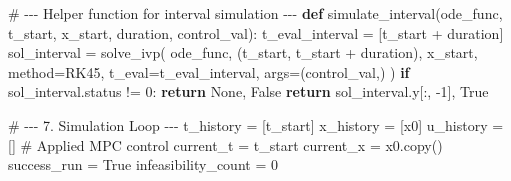 \documentclass[
  letterpaper,
  DIV=11,
  numbers=noendperiod,
  oneside]{scrartcl}
\newenvironment{Shaded}{\begin{snugshade}}{\end{snugshade}}
\newcommand{\CommentTok}[1]{\textcolor[rgb]{0.37,0.37,0.37}{#1}}
\newcommand{\ControlFlowTok}[1]{\textcolor[rgb]{0.00,0.23,0.31}{\textbf{#1}}}
\newcommand{\DecValTok}[1]{\textcolor[rgb]{0.68,0.00,0.00}{#1}}
\newcommand{\KeywordTok}[1]{\textcolor[rgb]{0.00,0.23,0.31}{\textbf{#1}}}
\newcommand{\NormalTok}[1]{\textcolor[rgb]{0.00,0.23,0.31}{#1}}
\newcommand{\OperatorTok}[1]{\textcolor[rgb]{0.37,0.37,0.37}{#1}}
\newcommand{\StringTok}[1]{\textcolor[rgb]{0.13,0.47,0.30}{#1}}
\newcommand{\VariableTok}[1]{\textcolor[rgb]{0.07,0.07,0.07}{#1}}
\begin{document}
\begin{Shaded}
\begin{Highlighting}[numbers=left,,]
\CommentTok{\# {-}{-}{-} Helper function for interval simulation {-}{-}{-}}
\KeywordTok{def}\NormalTok{ simulate\_interval(ode\_func, t\_start, x\_start, duration, control\_val):}
\NormalTok{    t\_eval\_interval }\OperatorTok{=}\NormalTok{ [t\_start }\OperatorTok{+}\NormalTok{ duration]}
\NormalTok{    sol\_interval }\OperatorTok{=}\NormalTok{ solve\_ivp(}
\NormalTok{        ode\_func, (t\_start, t\_start }\OperatorTok{+}\NormalTok{ duration), x\_start, method}\OperatorTok{=}\StringTok{\textquotesingle{}RK45\textquotesingle{}}\NormalTok{,}
\NormalTok{        t\_eval}\OperatorTok{=}\NormalTok{t\_eval\_interval, args}\OperatorTok{=}\NormalTok{(control\_val,)}
\NormalTok{    )}
    \ControlFlowTok{if}\NormalTok{ sol\_interval.status }\OperatorTok{!=} \DecValTok{0}\NormalTok{: }\ControlFlowTok{return} \VariableTok{None}\NormalTok{, }\VariableTok{False}
    \ControlFlowTok{return}\NormalTok{ sol\_interval.y[:, }\OperatorTok{{-}}\DecValTok{1}\NormalTok{], }\VariableTok{True}

\CommentTok{\# {-}{-}{-} 7. Simulation Loop {-}{-}{-}}
\NormalTok{t\_history }\OperatorTok{=}\NormalTok{ [t\_start]}
\NormalTok{x\_history }\OperatorTok{=}\NormalTok{ [x0]}
\NormalTok{u\_history }\OperatorTok{=}\NormalTok{ [] }\CommentTok{\# Applied MPC control}
\NormalTok{current\_t }\OperatorTok{=}\NormalTok{ t\_start}
\NormalTok{current\_x }\OperatorTok{=}\NormalTok{ x0.copy()}
\NormalTok{success\_run }\OperatorTok{=} \VariableTok{True}
\NormalTok{infeasibility\_count }\OperatorTok{=} \DecValTok{0}


\end{Highlighting}
\end{Shaded}
\end{document}
